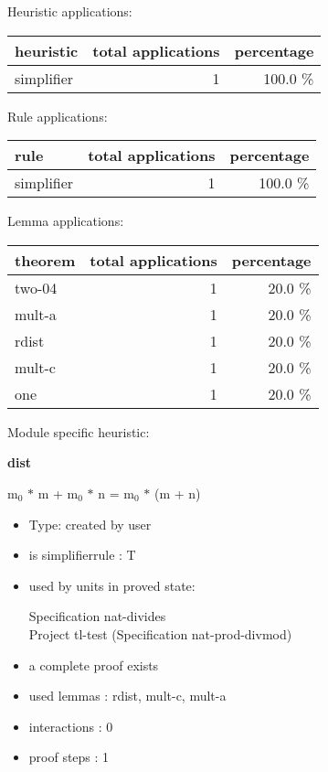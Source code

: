 \documentclass[a4paper]{article}
\begin{document}
\medskip


Heuristic applications:

\begin{supertabular}{l|r|r}
heuristic	& total applications & percentage \\ \hline
simplifier & 1 & 100.0 \% \\

\end{supertabular}

Rule applications:

\begin{supertabular}{l|r|r}
rule	        & total applications & percentage \\ \hline
simplifier & 1 & 100.0 \% \\

\end{supertabular}

Lemma applications:

\begin{supertabular}{l|r|r}
theorem	        & total applications & percentage \\ \hline
two-04 & 1 & 20.0 \% \\
mult-a & 1 & 20.0 \% \\
rdist & 1 & 20.0 \% \\
mult-c & 1 & 20.0 \% \\
one & 1 & 20.0 \% \\

\end{supertabular}

Module specific heuristic:

\pagebreak

{\LARGE\bf dist}\label{lemma-dist}

\medskip

 \Fol $\mbox{m}_{0}$ $*$ m + $\mbox{m}_{0}$ $*$ n = $\mbox{m}_{0}$ $*$ (m + n)

\begin{itemize}

\item Type: created by user

\item is simplifierrule : T
\item used by units in proved state:

Specification nat-divides \\
Project tl-test (Specification nat-prod-divmod)
\item       a complete proof exists
\item       used lemmas  : rdist, mult-c, mult-a
\item       interactions : 0
\item       proof steps  : 1
\end{itemize}
\end{document}
